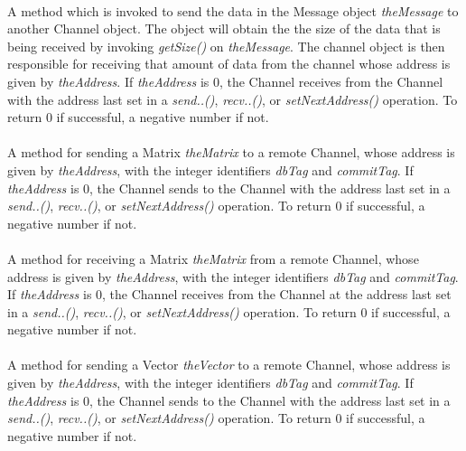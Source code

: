 \\
A method which is invoked to send the data in the Message object {\em
theMessage} to another Channel object. The object will obtain the
the size of the data that is being received by invoking {\em getSize()}
on {\em theMessage}. The channel object is then responsible for
receiving that amount of data from the channel whose address is given
by {\em theAddress}. If {\em theAddress} is $0$, the Channel receives from
the Channel with the address last set in a {\em send..()}, {\em
recv..()}, or {\em setNextAddress()} operation. To return $0$ if
successful, a negative number if not. \\  


\\
A method for sending a Matrix {\em theMatrix} to a
remote Channel, whose address is given by {\em theAddress}, with the
integer identifiers {\em dbTag} and {\em commitTag}. If {\em theAddress} 
is $0$, the Channel sends to the Channel with the address last set in
a {\em send..()}, {\em recv..()}, or {\em setNextAddress()}
operation. To return $0$ if successful, a negative number if not. \\ 


\\
A method for receiving a Matrix {\em theMatrix} from a
remote Channel, whose address is given by {\em theAddress}, with the
integer identifiers {\em dbTag} and {\em commitTag}. If {\em theAddress} 
is $0$, the Channel receives from the Channel at the address last set
in a {\em send..()}, {\em recv..()}, or {\em setNextAddress()}
operation. To return $0$ if successful, a negative number if not. \\ 

\\
A method for sending a Vector {\em theVector} to a
remote Channel, whose address is given by {\em theAddress}, with the
integer identifiers {\em dbTag} and {\em commitTag}. If {\em theAddress} 
is $0$, the Channel sends to the Channel with the address last set in
a {\em send..()}, {\em recv..()}, or {\em setNextAddress()}
operation. To return $0$ if successful, a negative number if not. \\ 


